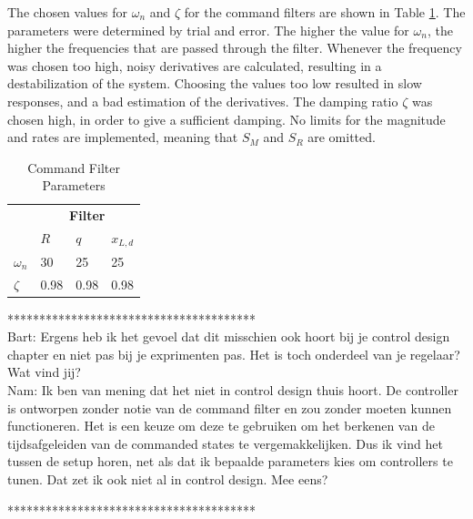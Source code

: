 The chosen values for $ \omega_n $ and $ \zeta $ for the command filters are shown in Table \ref{tab:set.cf}. 
The parameters were determined by trial and error. 
The higher the value for $ \omega_n $, the higher the frequencies that are passed through the filter. 
Whenever the frequency was chosen too high, noisy derivatives are calculated, resulting in a destabilization of the system.
Choosing the values too low resulted in slow responses, and a bad estimation of the derivatives.
The damping ratio $ \zeta $ was chosen high, in order to give a sufficient damping. No limits for the magnitude and rates are implemented, meaning that $ S_M $ and $ S_R $ are omitted.
\begin{table}[h!]
	\centering
\begin{tabular}{|l|lll|}
	\hline
	& \multicolumn{3}{c|}{\textbf{Filter}} \\ \cline{2-4} 
	& $ R  $     & $ q $      & $ x_{L,d} $   \\ \hline
	$ \omega_n $ & 30     & 25     & 25        \\
	$ \zeta  $   & 0.98   & 0.98   & 0.98      \\ \hline
\end{tabular}
	\caption{Command Filter Parameters}
\label{tab:set.cf}
\end{table}

***************************************\\
Bart: Ergens heb ik het gevoel dat dit misschien ook hoort bij je control design chapter en niet pas bij je exprimenten pas. Het is toch onderdeel van je regelaar? Wat vind jij? \\
Nam: Ik ben van mening dat het niet in control design thuis hoort. De controller is ontworpen zonder notie van de command filter en zou zonder moeten kunnen functioneren. 
Het is een keuze om deze te gebruiken om het berkenen van de tijdsafgeleiden van de commanded states te vergemakkelijken. Dus ik vind het tussen de setup horen, net als dat ik bepaalde parameters kies om controllers te tunen. Dat zet ik ook niet al in control design. Mee eens?

***************************************\\


